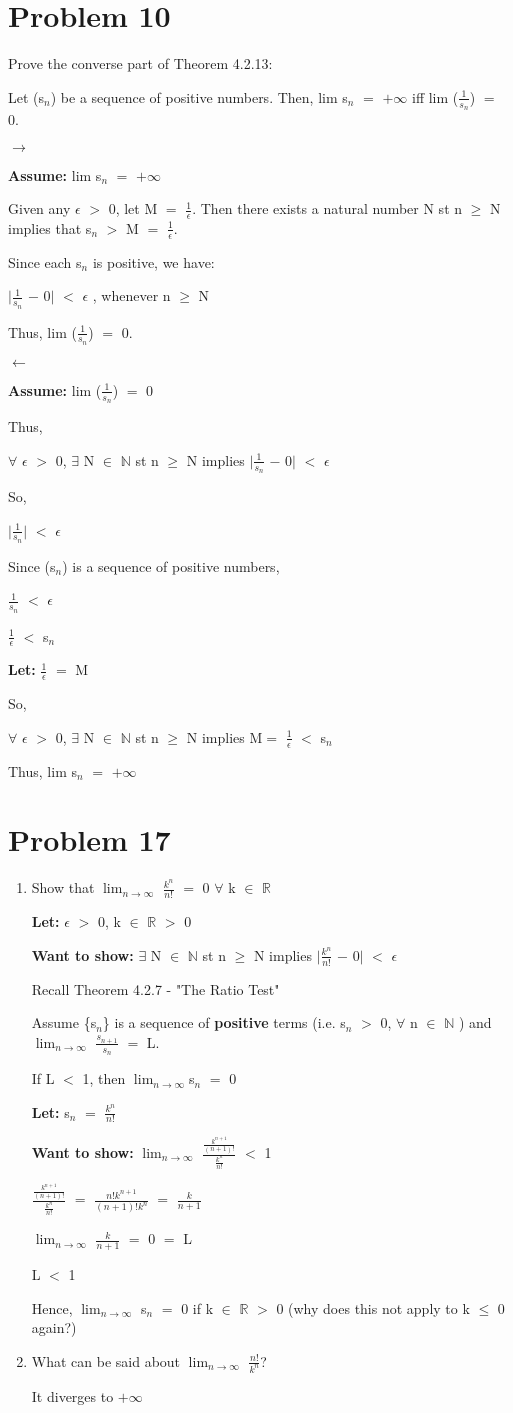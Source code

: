 \documentclass{article}
\newcommand{\mt}[1]{\ensuremath{#1}}
\newcommand\bsc[2][\DefaultOpt]{%
  \def\DefaultOpt{#2}%
  \section[#1]{#2}%
}
\newcommand{\balist}{\begin{enumerate}[label=\alph*.]}
\newcommand{\elist}{\end{enumerate}}
\newcommand{\lt}[1]{\textbf{Let: } #1}
\newcommand{\wts}[1]{\textbf{Want to show: } #1}
\newcommand{\as}[1]{\textbf{Assume: } #1}
\newcommand{\br}{\mt{\mathbb{R}} }       %
\newcommand{\bn}{\mt{\mathbb{N}} }       %
\newcommand{\ep}{\mt{\epsilon} }         %
\newcommand{\fa}{\mt{\forall} }          %
\newcommand{\mem}{\mt{\in} }
\newcommand{\exs}{\mt{\exists} }
\newcommand{\lra}{ \mt{\longrightarrow} } %
\newcommand{\lla}{ \mt{\longleftarrow} }  %
\newcommand{\av}[1]{\mt{|}#1\mt{|}}  %
\newcommand{\prn}[1]{(#1)}
\newcommand{\bk}[1]{\{#1\}}
\newcommand{\ps}{\mt{+} }
\newcommand{\ms}{\mt{-} }
\newcommand{\ls}{\mt{<} }
\newcommand{\gr}{\mt{>} }
\newcommand{\lse}{\mt{\leq} }
\newcommand{\gre}{\mt{\geq} }
\newcommand{\eql}{\mt{=} }
\newcommand{\uw}[2]{#1\mt{_{#2}}}
\newcommand{\frc}[2]{\mt{\frac{#1}{#2}}}
\newcommand{\lmti}[1]{\mt{\displaystyle{\lim_{#1 \to \infty}}}}
\begin{document}
\bsc{Problem 10}{
Prove the converse part of Theorem 4.2.13:

Let \prn{\uw{s}{n}} be a sequence of positive numbers. Then, lim \uw{s}{n} \eql $+\infty$ iff lim (\frc{1}{\uw{s}{n}}) \eql 0.

\lra

\as{lim \uw{s}{n} \eql $+\infty$}

Given any \ep \gr 0, let M \eql \frc{1}{\ep}. Then there exists a natural number N st n \gre N implies that \uw{s}{n} \gr M \eql \frc{1}{\ep}.

Since each \uw{s}{n} is positive, we have:

\av{\frc{1}{\uw{s}{n}} \ms 0} \ls \ep, whenever n \gre N

Thus, lim (\frc{1}{\uw{s}{n}}) \eql 0.

\lla 

\as{lim (\frc{1}{\uw{s}{n}}) \eql 0}

Thus,

\fa \ep \gr 0, \exs N \mem \bn st n \gre N implies \av{\frc{1}{\uw{s}{n}} \ms 0} \ls \ep

So,

\av{\frc{1}{\uw{s}{n}}} \ls \ep

Since \prn{\uw{s}{n}} is a sequence of positive numbers,

\frc{1}{\uw{s}{n}} \ls \ep

\frc{1}{\ep} \ls \uw{s}{n}

\lt{\frc{1}{\ep} \eql M}

So,

\fa \ep \gr 0, \exs N \mem \bn st n \gre N implies M\eql\frc{1}{\ep} \ls \uw{s}{n}

Thus, lim \uw{s}{n} \eql $+\infty$

}

\bsc{Problem 17}{
\balist
\item Show that \lmti{n} \frc{k^n}{n!} \eql 0 \fa k \mem \br
	
	\lt{\ep \gr 0, k \mem \br \gr 0}
	
	\wts{\exs N \mem \bn st n \gre N implies \av{\frc{k^n}{n!} \ms 0} \ls \ep}
	
	Recall Theorem 4.2.7 - "The Ratio Test"
	
	Assume \bk{\uw{s}{n}} is a sequence of \textbf{positive} terms (i.e. \uw{s}{n} \gr 0, \fa n \mem \bn) and \lmti{n} \frc{\uw{s}{n \ps 1}}{\uw{s}{n}} \eql L.
		
	If L \ls 1, then \lmti{n}\uw{s}{n} \eql 0
	
	\lt{\uw{s}{n} \eql \frc{k^n}{n!}}
	
	\wts{\lmti{n} \frc{\frc{k^{n + 1}}{{(n + 1)}!}}{\frc{k^n}{n!}} \ls 1}
	
	\frc{\frc{k^{n + 1}}{{(n + 1)}!}}{\frc{k^n}{n!}} \eql \frc{n!k^{n + 1}}{(n + 1)!k^n} \eql \frc{k}{n \ps 1}
	
	\lmti{n} \frc{k}{n + 1} \eql 0 \eql L
	
	L \ls 1
	
	Hence, \lmti{n} \uw{s}{n} \eql 0 if k \mem \br \gr 0 (why does this not apply to k \lse 0 again?)

\item What can be said about \lmti{n} \frc{n!}{k^n}?
	
	It diverges to $+\infty$
\elist
}
\end{document}
